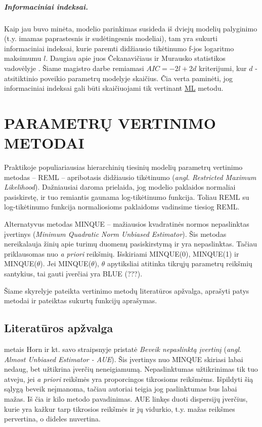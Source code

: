 \documentclass[12pt,a4paper]{article}
\begin{document}
\subparagraph{Informaciniai indeksai.} Kaip jau buvo minėta, modelio parinkimas susideda iš dviejų modelių palyginimo (t.y. imamas paprastesnis ir sudėtingesnis modeliai), tam yra sukurti informaciniai indeksai, kurie paremti didžiausio tikėtinumo f-jos logaritmo maksimumu $l$. Daugiau apie juos Čekanavičiaus ir Murausko statistikos vadovėlyje \cite{cek}. Šiame magistro darbe remiamasi $AIC=-2l+2d$ kriterijumi, kur $d$ - atsitiktinio poveikio parametrų modelyje skaičius. Čia verta paminėti, jog informaciniai indeksai gali būti skaičiuojami tik vertinant \hyperlink{reml}{ML} metodu.

\newpage
\section{PARAMETRŲ VERTINIMO METODAI} \label{sec:vert}
\indent Praktikoje populiariausias hierarchinių tiesinių modelių parametrų vertinimo metodas -- REML -- apribotasis didžiausio tikėtinumo (\textit{angl. Restricted Maximum Likelihood}). Dažniausiai daroma prielaida, jog modelio paklaidos normaliai pasiskirstę, ir tuo remiantis gaunama log-tikėtinumo funkcija. Toliau REML su log-tikėtinumo funkcija normaliosioms paklaidoms vadinsime tiesiog REML. 

\indent Alternatyvus metodas MINQUE -- mažiausios kvadratinės normos nepaslinktas įvertinys (\textit{Minimum Quadratic Norm Unbiased Estimator}). Šis metodas nereikalauja žinių apie turimų duomenų pasiskirstymą ir yra nepaslinktas. Tačiau priklausomas nuo \textit{a priori} reikšmių. Išskiriami MINQUE(0), MINQUE(1) ir MINQUE($\theta$). Jei MINQUE($\theta$), $\theta$ apytiksliai atitinka tikrųjų parametrų reikšmių santykius, tai gauti įverčiai yra BLUE (???).

\indent Šiame skyrelyje pateikta vertinimo metodų literatūros apžvalga, aprašyti patys metodai ir pateiktas sukurtų funkcijų aprašymas.

\subsection{Literatūros apžvalga}

 metais Horn ir kt. savo straipsnyje \cite{AUE} pristatė \textit{Beveik nepaslinktą įvertinį} (\textit{angl. Almost Unbiased Estimator - AUE}). Šis įvertinys nuo MINQUE skiriasi labai nedaug, bet užtikrina įverčių neneigiamumą. Nepaslinktumas užtikrinimas tik tuo atveju, jei \textit{a priori} reikšmės yra proporcingos tikrosioms reikšmėms. Išpildyti šią sąlygą beveik neįmanoma, tačiau autoriai teigia jog paslinktumas bus labai mažas. Iš čia ir kilo metodo pavadinimas. AUE linkęs duoti dispersijų įverčius, kurie yra kažkur tarp tikrosios reikšmės ir jų vidurkio, t.y. mažas reikšmes pervertina, o dideles nuvertina.
\end{document}
